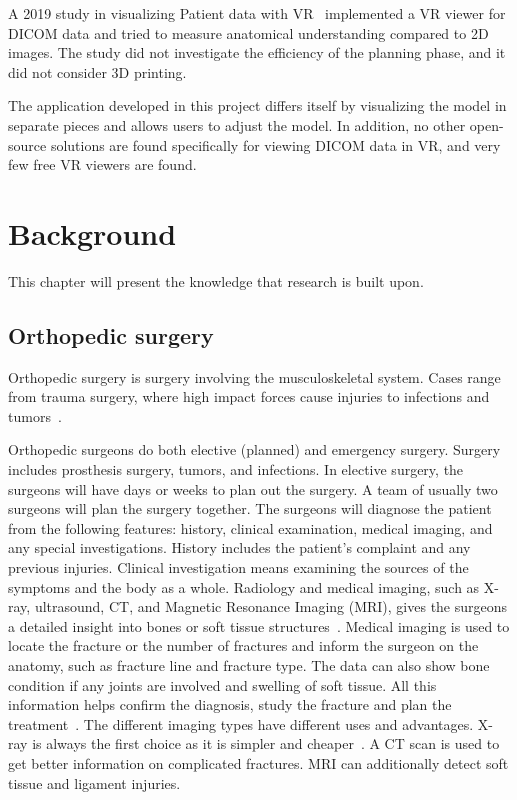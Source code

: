 \documentclass[a4paper]{report}
\begin{document}
A 2019 study in visualizing Patient data with VR~\cite{vertemati_virtual_2019} implemented a VR viewer for DICOM data and tried to measure anatomical understanding compared to 2D images. The study did not investigate the efficiency of the planning phase, and it did not consider 3D printing.

The application developed in this project differs itself by visualizing the model in separate pieces and allows users to adjust the model.
In addition, no other open-source solutions are found specifically for viewing DICOM data in VR, and very few free VR viewers are found.

\chapter{Background}\label{Background}
This chapter will present the knowledge that research is built upon.

\section{Orthopedic surgery}

Orthopedic surgery is surgery involving the musculoskeletal system. Cases range from trauma surgery, where high impact forces cause injuries to infections and tumors~\cite{swiontkowski_manual_2013}.

Orthopedic surgeons do both elective (planned) and emergency surgery. Surgery includes prosthesis surgery, tumors, and infections.
In elective surgery, the surgeons will have days or weeks to plan out the surgery. A team of usually two surgeons will plan the surgery together.
The surgeons will diagnose the patient from the following features: history, clinical examination, medical imaging, and any special investigations. History includes the patient's complaint and any previous injuries. Clinical investigation means examining the sources of the symptoms and the body as a whole. Radiology and medical imaging, such as X-ray, ultrasound, CT, and Magnetic Resonance Imaging (MRI), gives the surgeons a detailed insight into bones or soft tissue structures~\cite{swiontkowski_manual_2013}.
Medical imaging is used to locate the fracture or the number of fractures and inform the surgeon on the anatomy, such as fracture line and fracture type.
The data can also show bone condition if any joints are involved and swelling of soft tissue. All this information helps confirm the diagnosis, study the fracture and plan the treatment~\cite{ebnezar_textbook_2016}.
The different imaging types have different uses and advantages.
X-ray is always the first choice as it is simpler and cheaper~\cite{ebnezar_textbook_2016}.
A CT scan is used to get better information on complicated fractures. MRI can additionally detect soft tissue and ligament injuries.
\end{document}
